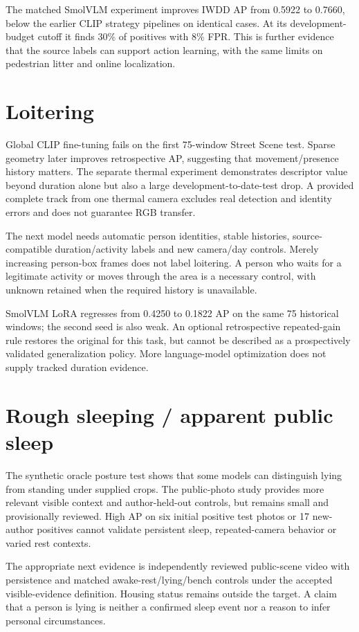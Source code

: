 The matched SmolVLM experiment improves IWDD AP from 0.5922 to 0.7660, below the earlier CLIP strategy pipelines on identical cases. At its development-budget cutoff it finds 30\% of positives with 8\% FPR. This is further evidence that the source labels can support action learning, with the same limits on pedestrian litter and online localization.

\section{Loitering}
Global CLIP fine-tuning fails on the first 75-window Street Scene test. Sparse geometry later improves retrospective AP, suggesting that movement/presence history matters. The separate thermal experiment demonstrates descriptor value beyond duration alone but also a large development-to-date-test drop. A provided complete track from one thermal camera excludes real detection and identity errors and does not guarantee RGB transfer.

The next model needs automatic person identities, stable histories, source-compatible duration/activity labels and new camera/day controls. Merely increasing person-box frames does not label loitering. A person who waits for a legitimate activity or moves through the area is a necessary control, with unknown retained when the required history is unavailable.

SmolVLM LoRA regresses from 0.4250 to 0.1822 AP on the same 75 historical windows; the second seed is also weak. An optional retrospective repeated-gain rule restores the original for this task, but cannot be described as a prospectively validated generalization policy. More language-model optimization does not supply tracked duration evidence.

\section{Rough sleeping / apparent public sleep}
The synthetic oracle posture test shows that some models can distinguish lying from standing under supplied crops. The public-photo study provides more relevant visible context and author-held-out controls, but remains small and provisionally reviewed. High AP on six initial positive test photos or 17 new-author positives cannot validate persistent sleep, repeated-camera behavior or varied rest contexts.

The appropriate next evidence is independently reviewed public-scene video with persistence and matched awake-rest/lying/bench controls under the accepted visible-evidence definition. Housing status remains outside the target. A claim that a person is lying is neither a confirmed sleep event nor a reason to infer personal circumstances.

